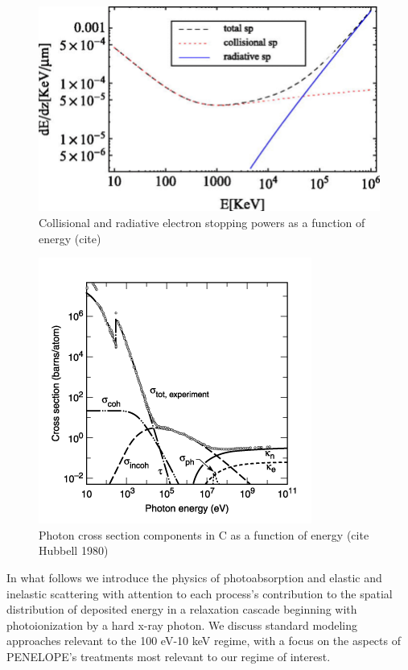 \documentclass [11pt, proquest, article] {uwthesis}[2016/11/22]
\begin{document}
\begin{figure}[h] 
\caption{Collisional and radiative electron stopping powers as a function of energy (cite)}
\label{fig:sp}
\centering
\includegraphics[scale=0.4]{../Figures/collisional_sp.png}
\end{figure}

\begin{figure}[h] 
\caption{Photon cross section components in C as a function of energy (cite Hubbell 1980)}
\label{fig:photon_sigma}
\centering
\includegraphics[scale=1]{../Figures/photon_sigma.png}
\end{figure}

In what follows we introduce the physics of photoabsorption and elastic and inelastic scattering with attention to each process's contribution to the spatial distribution of deposited energy in a relaxation cascade beginning with photoionization by a hard x-ray photon. We discuss standard modeling approaches relevant to the 100 eV-10 keV regime, with a focus on the aspects of PENELOPE's treatments most relevant to our regime of interest. %
\end{document}
